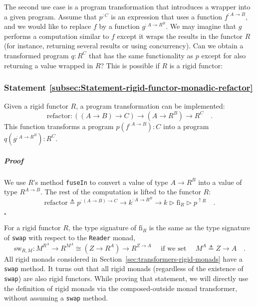 The second use case is a program transformation that introduces a
wrapper into a given program. Assume that $p^{:C}$ is an expression
that uses a function $f^{:A\rightarrow B}$, and we would like to
replace $f$ by a function $g^{:A\rightarrow R^{B}}$. We may imagine
that $g$ performs a computation similar to $f$ except it wraps the
results in the functor $R$ (for instance, returning several results
or using concurrency). Can we obtain a transformed program $q:R^{C}$
that has the same functionality as $p$ except for also returning
a value wrapped in $R$? This is possible if $R$ is a rigid functor:

\subsubsection{Statement \label{subsec:Statement-rigid-functor-monadic-refactor}\ref{subsec:Statement-rigid-functor-monadic-refactor}}

Given a rigid functor $R$, a program transformation can be implemented:
\[
\text{refactor}:((A\rightarrow B)\rightarrow C)\rightarrow(A\rightarrow R^{B})\rightarrow R^{C}\quad.
\]
This function transforms a program $p(f^{:A\rightarrow B}):C$ into
a program $q(g^{:A\rightarrow R^{B}}):R^{C}$.

\subparagraph{Proof}

We use $R$\textsf{'}s method \lstinline!fuseIn! to convert a value of type
$A\rightarrow R^{B}$ into a value of type $R^{A\rightarrow B}$.
The rest of the computation is lifted to the functor $R$:
\[
\text{refactor}\triangleq p^{:\left(A\rightarrow B\right)\rightarrow C}\rightarrow k^{:A\rightarrow R^{B}}\rightarrow k\triangleright\text{fi}_{R}\triangleright p^{\uparrow R}\quad.
\]

$\square$

For a rigid functor $R$, the type signature of $\text{fi}_{R}$ is
the same as the type signature of \lstinline!swap! with respect to
the \lstinline!Reader! monad,
\[
\text{sw}_{R,M}:M^{R^{A}}\rightarrow R^{M^{A}}\cong(Z\rightarrow R^{A})\rightarrow R^{Z\rightarrow A}\quad\text{ if we set }\quad M^{A}\triangleq Z\rightarrow A\quad.
\]
All rigid monads considered in Section~\ref{sec:transformers-rigid-monads}
have a \lstinline!swap! method. It turns out that all rigid monads
(regardless of the existence of \lstinline!swap!) are also rigid
functors. While proving that statement, we will directly use the definition
of rigid monads via the composed-outside monad transformer, without
assuming a \lstinline!swap! method.

